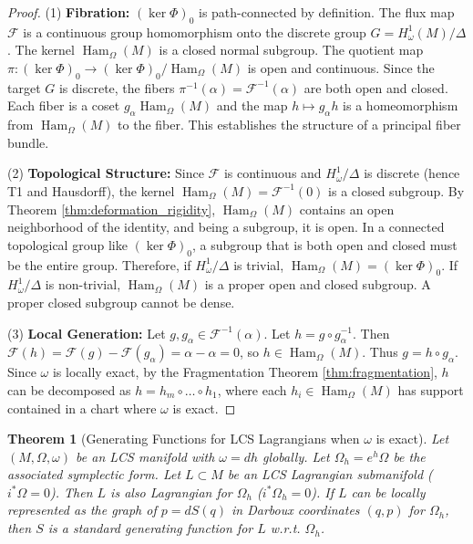 \documentclass[11pt,a4paper]{amsart}
\newtheorem{theorem}{Theorem}[section]
\theoremstyle{definition}
\theoremstyle{remark}
\newcommand{\Ham}{\operatorname{Ham}}
\begin{document}
	\begin{proof}
		(1) \textbf{Fibration:} $(\ker \Phi)_0$ is path-connected by definition. The flux map $\mathcal{F}$ is a continuous group homomorphism onto the discrete group $G = H_\omega^1(M)/\Delta$. The kernel $\Ham_\Omega(M)$ is a closed normal subgroup. The quotient map $\pi : (\ker \Phi)_0 \to (\ker \Phi)_0 / \Ham_\Omega(M)$ is open and continuous. Since the target $G$ is discrete, the fibers $\pi^{-1}(\alpha) = \mathcal{F}^{-1}(\alpha)$ are both open and closed. Each fiber is a coset $g_\alpha \Ham_\Omega(M)$ and the map $h \mapsto g_\alpha h$ is a homeomorphism from $\Ham_\Omega(M)$ to the fiber. This establishes the structure of a principal fiber bundle.
		
		(2) \textbf{Topological Structure:} Since $\mathcal{F}$ is continuous and $H_\omega^1/\Delta$ is discrete (hence T1 and Hausdorff), the kernel $\Ham_\Omega(M) = \mathcal{F}^{-1}(0)$ is a closed subgroup. By Theorem \ref{thm:deformation_rigidity}, $\Ham_\Omega(M)$ contains an open neighborhood of the identity, and being a subgroup, it is open. In a connected topological group like $(\ker \Phi)_0$, a subgroup that is both open and closed must be the entire group. Therefore, if $H_\omega^1/\Delta$ is trivial, $\Ham_\Omega(M) = (\ker \Phi)_0$. If $H_\omega^1/\Delta$ is non-trivial, $\Ham_\Omega(M)$ is a proper open and closed subgroup. A proper closed subgroup cannot be dense.
		
		(3) \textbf{Local Generation:} Let $g, g_\alpha \in \mathcal{F}^{-1}(\alpha)$. Let $h = g \circ g_\alpha^{-1}$. Then $\mathcal{F}(h) = \mathcal{F}(g) - \mathcal{F}(g_\alpha) = \alpha - \alpha = 0$, so $h \in \Ham_\Omega(M)$. Thus $g = h \circ g_\alpha$. Since $\omega$ is locally exact, by the Fragmentation Theorem \ref{thm:fragmentation}, $h$ can be decomposed as $h = h_m \circ \dots \circ h_1$, where each $h_i \in \Ham_\Omega(M)$ has support contained in a chart where $\omega$ is exact.
	\end{proof}
	
	\begin{theorem}[Generating Functions for LCS Lagrangians when $\omega$ is exact] \label{thm:generating_functions}
		Let $(M, \Omega, \omega)$ be an LCS manifold with $\omega = dh$ globally. Let $\Omega_h = e^h\Omega$ be the associated symplectic form. Let $L \subset M$ be an LCS Lagrangian submanifold ($i^*\Omega = 0$). Then $L$ is also Lagrangian for $\Omega_h$ ($i^*\Omega_h = 0$). If $L$ can be locally represented as the graph of $p = dS(q)$ in Darboux coordinates $(q, p)$ for $\Omega_h$, then $S$ is a standard generating function for $L$ w.r.t. $\Omega_h$.
	\end{theorem}
	
\end{document}
